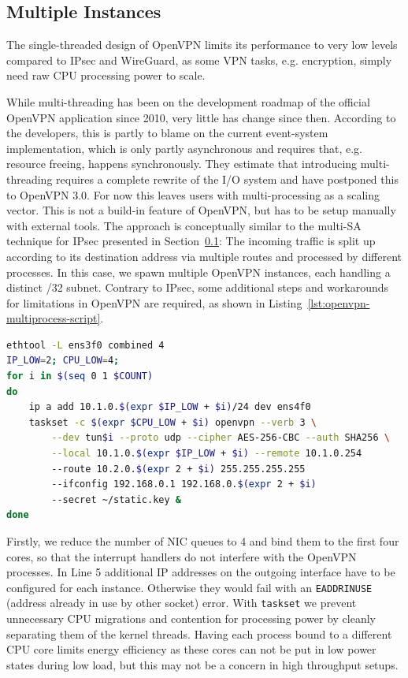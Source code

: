 \documentclass[IN,11pt,twoside,openright,master,english]{tumthesis}
\begin{document}
\subsection{Multiple Instances}
The single-threaded design of OpenVPN limits its performance to very low levels compared to IPsec and WireGuard, as some VPN tasks, e.g. encryption, simply need raw CPU processing power to scale.

While multi-threading has been on the development roadmap of the official OpenVPN application since 2010, very little has change since then. According to the developers, this is partly to blame on the current event-system implementation, which is only partly asynchronous and requires that, e.g. resource freeing, happens synchronously\cite{}.
They estimate that introducing multi-threading requires a complete rewrite of the I/O system and have postponed this to OpenVPN 3.0.
For now this leaves users with multi-processing as a scaling vector. This is not a build-in feature of OpenVPN, but has to be setup manually with external tools. 
The approach is conceptually similar to the multi-SA technique for IPsec presented in Section~\ref{}: The incoming traffic is split up according to its destination address via multiple routes and processed by different processes.
In this case, we spawn multiple OpenVPN instances, each handling a distinct /32 subnet. Contrary to IPsec, some additional steps and workarounds for limitations in OpenVPN are required, as shown in Listing~\ref{lst:openvpn-multiprocess-script}.

\begin{lstlisting}[caption={Script to set up multi-process OpenVPN},captionpos=b,label={lst:openvpn-multiprocess-script},language=bash]
ethtool -L ens3f0 combined 4
IP_LOW=2; CPU_LOW=4;
for i in $(seq 0 1 $COUNT)
do
	ip a add 10.1.0.$(expr $IP_LOW + $i)/24 dev ens4f0
	taskset -c $(expr $CPU_LOW + $i) openvpn --verb 3 \
		--dev tun$i --proto udp --cipher AES-256-CBC --auth SHA256 \
		--local 10.1.0.$(expr $IP_LOW + $i) --remote 10.1.0.254
		--route 10.2.0.$(expr 2 + $i) 255.255.255.255 
		--ifconfig 192.168.0.1 192.168.0.$(expr 2 + $i)
		--secret ~/static.key &
done
\end{lstlisting}
Firstly, we reduce the number of NIC queues to 4 and bind them to the first four cores, so that the interrupt handlers do not interfere with the OpenVPN processes.
In Line 5 additional IP addresses on the outgoing interface have to be configured for each instance. Otherwise they would fail with an \texttt{EADDRINUSE} (address already in use by other socket) error.
With \texttt{taskset} we prevent unnecessary CPU migrations and contention for processing power by cleanly separating them of the kernel threads. Having each process bound to a different CPU core limits energy efficiency as these cores can not be put in low power states during low load, but this may not be a concern in high throughput setups.
\end{document}
